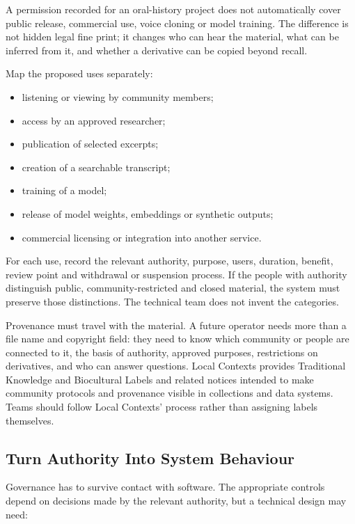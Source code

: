 A permission recorded for an oral-history project does not automatically cover public release, commercial use, voice cloning or model training. The difference is not hidden legal fine print; it changes who can hear the material, what can be inferred from it, and whether a derivative can be copied beyond recall.


Map the proposed uses separately:


\begin{itemize}[leftmargin=*]
\item listening or viewing by community members;
\item access by an approved researcher;
\item publication of selected excerpts;
\item creation of a searchable transcript;
\item training of a model;
\item release of model weights, embeddings or synthetic outputs;
\item commercial licensing or integration into another service.
\end{itemize}

For each use, record the relevant authority, purpose, users, duration, benefit, review point and withdrawal or suspension process. If the people with authority distinguish public, community-restricted and closed material, the system must preserve those distinctions. The technical team does not invent the categories.


Provenance must travel with the material. A future operator needs more than a file name and copyright field: they need to know which community or people are connected to it, the basis of authority, approved purposes, restrictions on derivatives, and who can answer questions. Local Contexts provides Traditional Knowledge and Biocultural Labels and related notices intended to make community protocols and provenance visible in collections and data systems. Teams should follow Local Contexts' process rather than assigning labels themselves. \autocite{local-contexts-labels}



\subsection{Turn Authority Into System Behaviour}


Governance has to survive contact with software. The appropriate controls depend on decisions made by the relevant authority, but a technical design may need:


